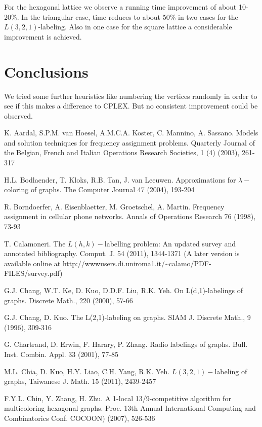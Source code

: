 \documentclass[smallextended]{svjour3}
\begin{document}
For the hexagonal lattice we observe a running time improvement of about 10-20\%. 
In the triangular case, time reduces to about 50\% in two cases for the $L(3,2,1)$-labeling. 
Also in one case for the square lattice a considerable improvement is achieved. 

\section{Conclusions} 

We tried some further heuristics like numbering the vertices randomly in order 
to see if this makes a difference to CPLEX. But no consistent improvement 
could be observed. 

\begin{thebibliography}{1} 
 

K. Aardal, S.P.M. van Hoesel, A.M.C.A. Koster, C. Mannino, A. Sassano. Models and solution techniques for frequency assignment problems. Quarterly Journal of the Belgian, French and Italian Operations Research Societies, 1 (4) (2003), 261-317

H.L. Bodlaender, T. Kloks, R.B. Tan, J. van Leeuwen. 
Approximations for $\lambda-$coloring of graphs. The Computer Journal 
47 (2004), 193-204  

R. Borndoerfer, A. Eisenblaetter, M. Groetschel, A. Martin. Frequency assignment in cellular phone networks. Annals of Operations Research 76 (1998), 73-93

T. Calamoneri. The $L(h,k)-$labelling problem: 
An updated survey and annotated bibliography. Comput. J. 54 (2011), 
1344-1371 (A later version is available online at http://wwwusers.di.uniroma1.it/\textasciitilde{}calamo/PDF-FILES/survey.pdf) 

G.J. Chang, W.T. Ke, D. Kuo, D.D.F. Liu, R.K. Yeh. 
On L(d,1)-labelings of graphs. Discrete Math., 220 (2000), 57-66 

G.J. Chang, D. Kuo. The L(2,1)-labeling on graphs. 
SIAM J. Discrete Math., 9 (1996), 309-316 

G. Chartrand, D. Erwin, F. Harary, P. Zhang. Radio labelings of graphs. Bull. Inst. Combin. Appl. 33 (2001), 77-85

M.L. Chia, D. Kuo, H.Y. Liao, C.H. Yang, R.K. Yeh. 
$L(3,2,1)-$labeling of graphs, Taiwanese J. Math. 15 (2011), 
2439-2457 

F.Y.L. Chin, Y. Zhang, H. Zhu. A 1-local 13/9-competitive algorithm for multicoloring hexagonal graphs. Proc. 13th Annual International Computing and Combinatorics Conf. COCOON) (2007), 526-536


\end{thebibliography}
\end{document}
